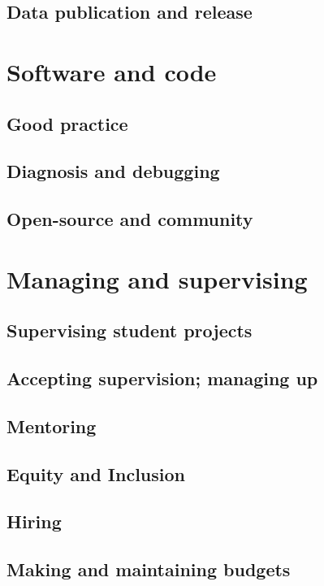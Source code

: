 \documentclass[letterpaper]{book}
\begin{document}
\chapter{Data publication and release}

\part{Software and code}

\chapter{Good practice}

\chapter{Diagnosis and debugging}

\chapter{Open-source and community}

\part{Managing and supervising}

\chapter{Supervising student projects}

\chapter{Accepting supervision; managing up}

\chapter{Mentoring}

\chapter{Equity and Inclusion}

\chapter{Hiring}

\chapter{Making and maintaining budgets}
\end{document}
